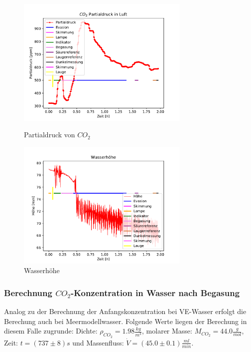 \documentclass[12pt]{article}
\begin{document}
\begin{figure}[H]
	\parbox{82.5mm}{
		\centering
		\includegraphics[width=82.5mm]{Meerwasser/Partialdruck}
		\caption{Partialdruck von $CO_2$}
	}
	\centering
	\parbox{82.5mm}{
		\centering
		\includegraphics[width=82.5mm]{Meerwasser/Wasserhoehe}
		\caption{Wasserh\"ohe }
	}
	\hfill%
	\parbox{82.5mm}{
		\centering
	}
\end{figure}


\subsubsection{Berechnung $CO_2$-Konzentration in Wasser nach Begasung}

Analog zu der Berechnung der Anfangskonzentration bei VE-Wasser erfolgt die Berechung auch bei
Meermodellwasser. Folgende Werte liegen der Berechung in diesem Falle zugrunde: Dichte: $\rho_{CO_2} = 1.98 \frac{kg}{m^3} $, molarer Masse: $M_{CO_2} = 44.0\frac{g}{mol} $, Zeit:  $t = (737 \pm 8)s$ und Massenfluss: $\dot V = (45.0 \pm 0.1)\frac{ml}{min}$.\\
\end{document}
